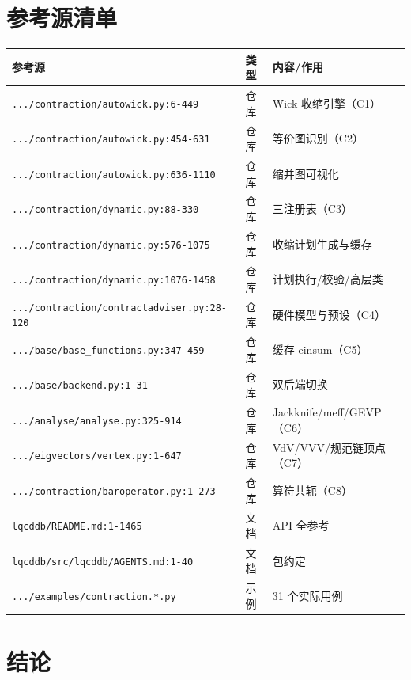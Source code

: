\documentclass[UTF8]{ctexart}
\begin{document}
\section{参考源清单}

\begin{xltabular}{\textwidth}{llX}
\toprule
\textcolor{evidence}{参考源} & 类型 & 内容/作用 \\
\midrule
\endhead
\texttt{\nolinkurl{.../contraction/autowick.py:6-449}} & 仓库 & Wick 收缩引擎（C1） \\
\texttt{\nolinkurl{.../contraction/autowick.py:454-631}} & 仓库 & 等价图识别（C2） \\
\texttt{\nolinkurl{.../contraction/autowick.py:636-1110}} & 仓库 & 缩并图可视化 \\
\texttt{\nolinkurl{.../contraction/dynamic.py:88-330}} & 仓库 & 三注册表（C3） \\
\texttt{\nolinkurl{.../contraction/dynamic.py:576-1075}} & 仓库 & 收缩计划生成与缓存 \\
\texttt{\nolinkurl{.../contraction/dynamic.py:1076-1458}} & 仓库 & 计划执行/校验/高层类 \\
\texttt{\nolinkurl{.../contraction/contractadviser.py:28-120}} & 仓库 & 硬件模型与预设（C4） \\
\texttt{\nolinkurl{.../base/base_functions.py:347-459}} & 仓库 & 缓存 einsum（C5） \\
\texttt{\nolinkurl{.../base/backend.py:1-31}} & 仓库 & 双后端切换 \\
\texttt{\nolinkurl{.../analyse/analyse.py:325-914}} & 仓库 & Jackknife/meff/GEVP（C6） \\
\texttt{\nolinkurl{.../eigvectors/vertex.py:1-647}} & 仓库 & VdV/VVV/规范链顶点（C7） \\
\texttt{\nolinkurl{.../contraction/baroperator.py:1-273}} & 仓库 & 算符共轭（C8） \\
\texttt{\nolinkurl{lqcddb/README.md:1-1465}} & 文档 & API 全参考 \\
\texttt{\nolinkurl{lqcddb/src/lqcddb/AGENTS.md:1-40}} & 文档 & 包约定 \\
\texttt{\nolinkurl{.../examples/contraction.*.py}} & 示例 & 31 个实际用例 \\
\bottomrule
\end{xltabular}

\section{结论}
\end{document}
